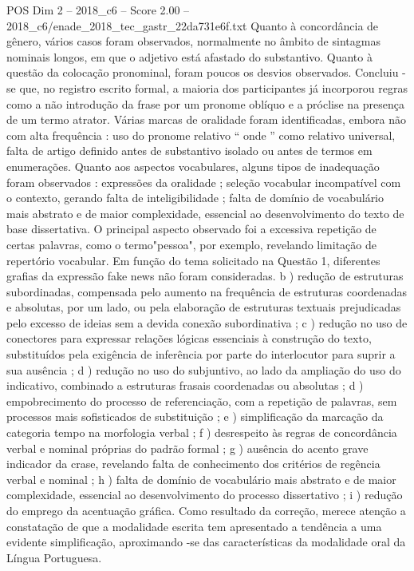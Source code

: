 \begin{textsample}{POS Dim 2 – 2018\_c6 – Score 2.00 – 2018\_c6/enade\_2018\_tec\_gastr\_22da731e6f.txt}
Quanto à concordância de gênero, vários casos foram observados, normalmente no âmbito de sintagmas nominais longos, em que o adjetivo está afastado do substantivo.
Quanto à questão da colocação pronominal, foram poucos os desvios observados.
Concluiu -se que, no registro escrito formal, a maioria dos participantes já incorporou regras como a não introdução da frase por um pronome oblíquo e a próclise na presença de um termo atrator.
Várias marcas de oralidade foram identificadas, embora não com alta frequência : uso do pronome relativo “ onde ” como relativo universal, falta de artigo definido antes de substantivo isolado ou antes de termos em enumerações.
Quanto aos aspectos vocabulares, alguns tipos de inadequação foram observados : expressões da oralidade ; seleção vocabular incompatível com o contexto, gerando falta de inteligibilidade ; falta de domínio de vocabulário mais abstrato e de maior complexidade, essencial ao desenvolvimento do texto de base dissertativa.
O principal aspecto observado foi a excessiva repetição de certas palavras, como o termo"pessoa", por exemplo, revelando limitação de repertório vocabular.
Em função do tema solicitado na Questão 1, diferentes grafias da expressão fake news não foram consideradas. b ) redução de estruturas subordinadas, compensada pelo aumento na frequência de estruturas coordenadas e absolutas, por um lado, ou pela elaboração de estruturas textuais prejudicadas pelo excesso de ideias sem a devida conexão subordinativa ; c ) redução no uso de conectores para expressar relações lógicas essenciais à construção do texto, substituídos pela exigência de inferência por parte do interlocutor para suprir a sua ausência ; d ) redução no uso do subjuntivo, ao lado da ampliação do uso do indicativo, combinado a estruturas frasais coordenadas ou absolutas ; d ) empobrecimento do processo de referenciação, com a repetição de palavras, sem processos mais sofisticados de substituição ; e ) simplificação da marcação da categoria tempo na morfologia verbal ; f ) desrespeito às regras de concordância verbal e nominal próprias do padrão formal ; g ) ausência do acento grave indicador da crase, revelando falta de conhecimento dos critérios de regência verbal e nominal ; h ) falta de domínio de vocabulário mais abstrato e de maior complexidade, essencial ao desenvolvimento do processo dissertativo ; i ) redução do emprego da acentuação gráfica.
Como resultado da correção, merece atenção a constatação de que a modalidade escrita tem apresentado a tendência a uma evidente simplificação, aproximando -se das características da modalidade oral da Língua Portuguesa.

\end{textsample}
